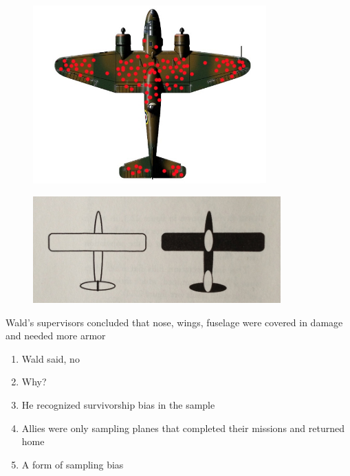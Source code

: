 \documentclass[aspectratio=1610,pdftex,dvipsnames,compress,xcolor={dvipsnames}]{beamer}
\begin{document}
\begin{frame}{}
    \begin{figure}
        \centering
        \includegraphics[width=0.80\textwidth]{wwii.plane.jpg}
    \end{figure}
\end{frame}


\begin{frame}{}
    \begin{figure}
        \centering
        \includegraphics[width=0.85\textwidth]{wwii.planes.jpg}
    \end{figure}
\end{frame}


\begin{frame}{Wald's supervisors concluded that nose, wings, fuselage were covered in damage and needed more armor}
    \begin{enumerate}[series=outerlist,topsep=0pt,itemsep=21pt,leftmargin=*,label=(\arabic*)]
        \item[]Wald said, no
        \item[]Why?
        \item[]He recognized survivorship bias in the sample
        \item[]Allies were only sampling planes that completed their missions and returned home
        \item[]A form of sampling bias
    \end{enumerate}
\end{frame}
\end{document}
